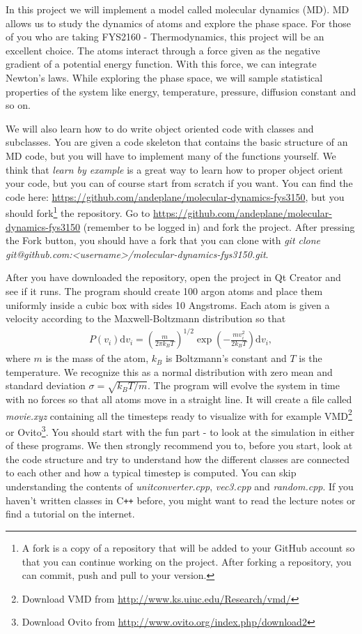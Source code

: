 \documentclass[11pt,a4wide]{article}
\newcommand{\dm}[1]{\mathrm{d}#1}
\begin{document}
In this project we will implement a model called molecular dynamics (MD). MD allows us to study the dynamics of atoms and explore the phase space. For those of you who are taking FYS2160 - Thermodynamics, this project will be an excellent choice. The atoms interact through a force given as the negative gradient of a potential energy function. With this force, we can integrate Newton's laws. While exploring the phase space, we will sample statistical properties of the system like energy, temperature, pressure, diffusion constant and so on.

We will also learn how to do write object oriented code with classes and subclasses. You are given a code skeleton that contains the basic structure of an MD code, but you will have to implement many of the functions yourself. We think that \textit{learn by example} is a great way to learn how to proper object orient your code, but you can of course start from scratch if you want. You can find the code here: \url{https://github.com/andeplane/molecular-dynamics-fys3150}, but you should fork\footnote{A fork is a copy of a repository that will be added to your GitHub account so that you can continue working on the project. After forking a repository, you can commit, push and pull to your version.} the repository. Go to \url{https://github.com/andeplane/molecular-dynamics-fys3150} (remember to be logged in) and fork the project. After pressing the Fork button, you should have a fork that you can clone with \textit{git clone git@github.com:<username>/molecular-dynamics-fys3150.git}.

After you have downloaded the repository, open the project in Qt Creator and see if it runs. The program should create 100 argon atoms and place them uniformly inside a cubic box with sides 10 Angstroms. Each atom is given a velocity according to the Maxwell-Boltzmann distribution so that
\begin{align}
	\label{eq:maxwell_boltzmann}
	P(v_i)\dm{v_i} = \left(\frac{m}{2\pi k_B T}\right)^{1/2} \exp\left(-\frac{m v_i^2}{2k_B T}\right) \dm{v_i},
\end{align}
where $m$ is the mass of the atom, $k_B$ is Boltzmann's constant and $T$ is the temperature. We recognize this as a normal distribution with zero mean and standard deviation $\sigma = \sqrt{k_B T/m}$. The program will evolve the system in time with no forces so that all atoms move in a straight line. It will create a file called \textit{movie.xyz} containing all the timesteps ready to visualize with for example VMD\footnote{Download VMD from \url{http://www.ks.uiuc.edu/Research/vmd/}} or Ovito\footnote{Download Ovito from \url{http://www.ovito.org/index.php/download2}}. You should start with the fun part - to look at the simulation in either of these programs. We then strongly recommend you to, before you start, look at the code structure and try to understand how the different classes are connected to each other and how a typical timestep is computed. You can skip understanding the contents of \textit{unitconverter.cpp}, \textit{vec3.cpp} and \textit{random.cpp}. If you haven't written classes in C{}\verb!++! before, you might want to read the lecture notes or find a tutorial on the internet. 
\end{document}
